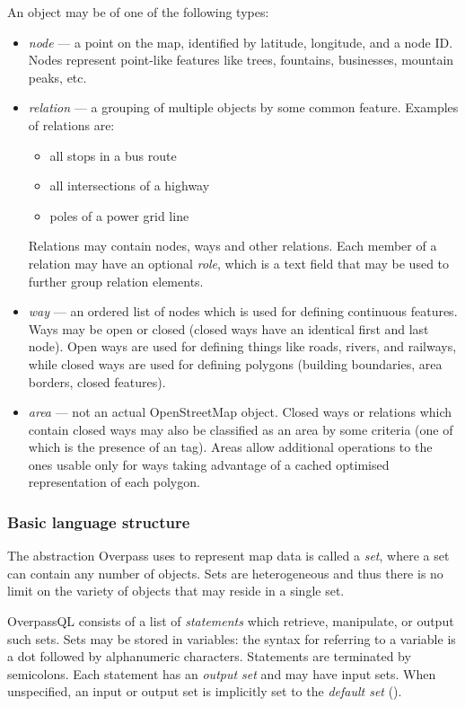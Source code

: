 \documentclass[main.tex]{subfiles}
\begin{document}
An object may be of one of the following types:
\begin{itemize}
    \item \emph{node} --- a point on the map, identified by latitude, longitude,
        and a node ID. Nodes represent point-like features like trees, fountains,
        businesses, mountain peaks, etc.
    \item \emph{relation} --- a grouping of multiple objects by some common
        feature. Examples of relations are:
        \begin{itemize}
            \item all stops in a bus route
            \item all intersections of a highway
            \item poles of a power grid line
        \end{itemize}
        Relations may contain nodes, ways and other relations. Each member of
        a relation may have an optional \emph{role}, which is a text field
        that may be used to further group relation elements.
    \item \emph{way} --- an ordered list of nodes which is used for defining
        continuous features. Ways may be open or closed (closed ways have an
        identical first and last node). Open ways are used for defining things
        like roads, rivers, and railways, while closed ways are used for defining
        polygons (building boundaries, area borders, closed features).
    \item \emph{area} --- not an actual OpenStreetMap object. Closed ways or relations
        which contain closed ways may also be classified as an area by some
        criteria (one of which is the presence of an  tag).
        Areas allow additional operations to the ones usable only for ways
        taking advantage of a cached optimised representation of each polygon.
\end{itemize}

\subsubsection{Basic language structure}
The abstraction Overpass uses to represent map data is called a \emph{set},
where a set can contain any number of objects. Sets are heterogeneous and thus
there is no limit on the variety of objects that may reside in a single set.

OverpassQL consists of a list of \emph{statements} which retrieve, manipulate,
or output such sets. Sets may be stored in variables: the syntax for referring
to a variable is a dot followed by alphanumeric characters.
Statements are terminated by semicolons.
Each statement has an \emph{output set} and may have input sets. When unspecified,
an input or output set is implicitly set to the \emph{default set} ().
\end{document}
